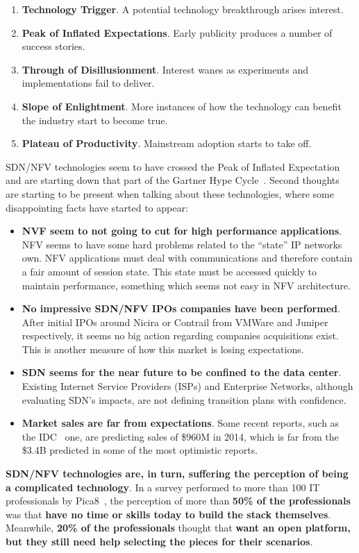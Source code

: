 \documentclass[a4paper, 12pt]{book}
\begin{document}
\begin{enumerate}\itemsep0pt
\item{\textbf{Technology Trigger}}. A potential technology breakthrough arises interest.
\item{\textbf{Peak of Inflated Expectations}}. Early publicity produces a number of success stories.
\item{\textbf{Through of Disillusionment}}. Interest wanes as experiments and implementations fail to deliver.
\item{\textbf{Slope of Enlightment}}. More instances of how the technology can benefit the industry start to become true.
\item{\textbf{Plateau of Productivity}}. Mainstream adoption starts to take off.
\end{enumerate}
SDN/NFV technologies seem to have crossed the Peak of Inflated Expectation and are starting down that part of the Gartner Hype Cycle~\cite{SDNandNFVHypeCycle}. Second thoughts are starting to be present when talking about these technologies, where some disappointing facts have started to appear:
\begin{itemize}\itemsep0pt
\item{\textbf{NVF seem to not going to cut for high performance applications}}. NFV seems to have some hard problems related to the ``state'' IP networks own. NFV applications must deal with communications and therefore contain a fair amount of session state. This state must be accessed quickly to maintain performance, something which seems not easy in NFV architecture.
\item{\textbf{No impressive SDN/NFV IPOs companies have been performed}}. After initial IPOs around Nicira or Contrail from VMWare and Juniper respectively, it seems no big action regarding companies acquisitions exist. This is another measure of how this market is losing expectations.
\item{\textbf{SDN seems for the near future to be confined to the data center}}. Existing Internet Service Providers (ISPs) and Enterprise Networks, although evaluating SDN's impacts, are not defining transition plans with confidence.
\item{\textbf{Market sales are far from expectations}}. Some recent reports, such as the IDC~\cite{SDNMarket20142018IDC} one, are predicting sales of \$960M in 2014, which is far from the \$3.4B predicted in some of the most optimistic reports.
\end{itemize}
\textbf{SDN/NFV technologies are, in turn, suffering the perception of being a complicated technology}. In a survey performed to more than 100 IT professionals by Pica8~\cite{Pica8Survey}, the perception of more than \textbf{50\% of the professionals} was that \textbf{have no time or skills today to build the stack themselves}. Meanwhile, \textbf{20\% of the professionals} thought that \textbf{want an open platform, but they still need help selecting the pieces for their scenarios}.\\
\end{document}
